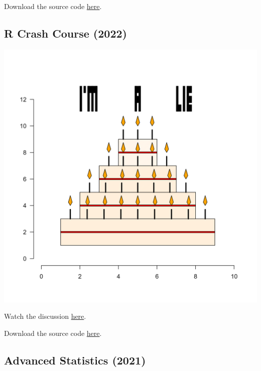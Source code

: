 \documentclass[
]{book}
\begin{document}
Download the source code \href{files/cake-winner-BSM-2023.R}{here}.

\hypertarget{r-crash-course-2022}{%
\subsection*{R Crash Course (2022)}\label{r-crash-course-2022}}

\includegraphics[width=28in]{figures/R2022cake}

Watch the discussion \href{https://youtu.be/uXfoIKguqME}{here}.

Download the source code \href{files/cake-winner-R-2022.Rmd}{here}.

\hypertarget{advanced-statistics-2021}{%
\subsection*{Advanced Statistics (2021)}\label{advanced-statistics-2021}}
\end{document}
